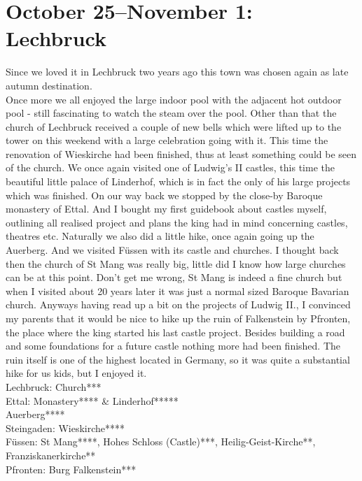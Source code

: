 \section{October 25--November 1: Lechbruck}
\label{1992:Lechbruck}

Since we loved it in Lechbruck two years ago this town was chosen again as late autumn destination.\\

Once more we all enjoyed the large indoor pool with the adjacent hot outdoor pool - still fascinating to watch the steam over the pool. Other than that the church of Lechbruck received a couple of new bells which were lifted up to the tower on this weekend with a large celebration going with it. This time the renovation of Wieskirche had been finished, thus at least something could be seen of the church. We once again visited one of Ludwig's II castles, this time the beautiful little palace of Linderhof, which is in fact the only of his large projects which was finished. On our way back we stopped by the close-by Baroque monastery of Ettal. And I bought my first guidebook about castles myself, outlining all realised project and plans the king had in mind concerning castles, theatres etc. Naturally we also did a little hike, once again going up the Auerberg. And we visited F\"ussen with its castle and churches. I thought back then the church of St Mang was really big, little did I know how large churches can be at this point. Don't get me wrong, St Mang is indeed a fine church but when I visited about 20 years later it was just a normal sized Baroque Bavarian church. Anyways having read up a bit on the projects of Ludwig II., I convinced my parents that it would be nice to hike up the ruin of Falkenstein by Pfronten, the place where the king started his last castle project. Besides building a road and some foundations for a future castle nothing more had been finished. The ruin itself is one of the highest located in Germany, so it was quite a substantial hike for us kids, but I enjoyed it.\\

Lechbruck: Church***\\
Ettal: Monastery**** \& Linderhof*****\\
Auerberg****\\
Steingaden: Wieskirche****\\
F\"ussen: St Mang****, Hohes Schloss (Castle)***, Heilig-Geist-Kirche**, Franziskanerkirche**\\
Pfronten: Burg Falkenstein***\\

